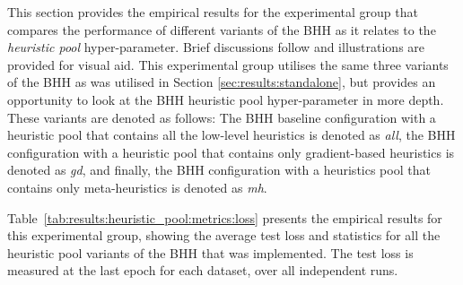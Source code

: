 This section provides the empirical results for the experimental group that compares the performance of different variants of the \acs{BHH} as it relates to the \textit{heuristic pool} hyper-parameter. Brief discussions follow and illustrations are provided for visual aid. This experimental group utilises the same three variants of the \acs{BHH} as was utilised in Section \ref{sec:results:standalone}, but provides an opportunity to look at the \acs{BHH} heuristic pool hyper-parameter in more depth. These variants are denoted as follows: The \acs{BHH} baseline configuration with a heuristic pool that contains all the low-level heuristics is denoted as \textit{all}, the \acs{BHH} configuration with a heuristic pool that contains only gradient-based heuristics is denoted as \textit{gd}, and finally, the \acs{BHH} configuration with a heuristics pool that contains only meta-heuristics is denoted as \textit{mh}.

Table~\ref{tab:results:heuristic_pool:metrics:loss} presents the empirical results for this experimental group, showing the average test loss and statistics for all the heuristic pool variants of the \acs{BHH} that was implemented. The test loss is measured at the last epoch for each dataset, over all independent runs.

